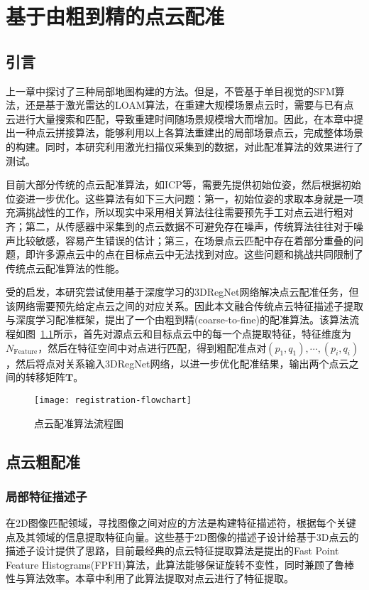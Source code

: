 
\chapter{基于由粗到精的点云配准}
\label{ch3}
\section{引言}
上一章中探讨了三种局部地图构建的方法。但是，不管基于单目视觉的SFM算法，还是基于激光雷达的LOAM算法，在重建大规模场景点云时，需要与已有点云进行大量搜索和匹配，导致重建时间随场景规模增大而增加。因此，在本章中提出一种点云拼接算法，能够利用以上各算法重建出的局部场景点云，完成整体场景的构建。同时，本研究利用激光扫描仪采集到的数据，对此配准算法的效果进行了测试。

目前大部分传统的点云配准算法，如ICP等，需要先提供初始位姿，然后根据初始位姿进一步优化。这些算法有如下三大问题：第一，初始位姿的求取本身就是一项充满挑战性的工作，所以现实中采用相关算法往往需要预先手工对点云进行粗对齐；第二，从传感器中采集到的点云数据不可避免存在噪声，传统算法往往对于噪声比较敏感，容易产生错误的估计；第三，在场景点云匹配中存在着部分重叠的问题，即许多源点云中的点在目标点云中无法找到对应。这些问题和挑战共同限制了传统点云配准算法的性能。

受\citet{pais20203dregnet}的启发，本研究尝试使用基于深度学习的3DRegNet网络解决点云配准任务，但该网络需要预先给定点云之间的对应关系。因此本文融合传统点云特征描述子提取与深度学习配准框架，提出了一个由粗到精(coarse-to-fine)的配准算法。该算法流程如图~\ref{registration-flowchart}所示，首先对源点云和目标点云中的每一个点提取特征，特征维度为$N_{\text{Feature}}$，然后在特征空间中对点进行匹配，得到粗配准点对$(p_1, q_1),\cdots, (p_i, q_i)$，然后将点对关系输入3DRegNet网络，以进一步优化配准结果，输出两个点云之间的转移矩阵$\boldsymbol{T}$。
\begin{figure}
	\centering
	\texttt{[image: registration-flowchart]}
	\caption{点云配准算法流程图}
	\label{registration-flowchart}
\end{figure}

\section{点云粗配准}
\subsection{局部特征描述子}
在2D图像匹配领域，寻找图像之间对应的方法是构建特征描述符，根据每个关键点及其领域的信息提取特征向量。这些基于2D图像的描述子设计给基于3D点云的描述子设计提供了思路，目前最经典的点云特征提取算法是\citet{rusu2009fast}提出的Fast Point Feature Histograms(FPFH)算法，此算法能够保证旋转不变性，同时兼顾了鲁棒性与算法效率。本章中利用了此算法提取对点云进行了特征提取。

